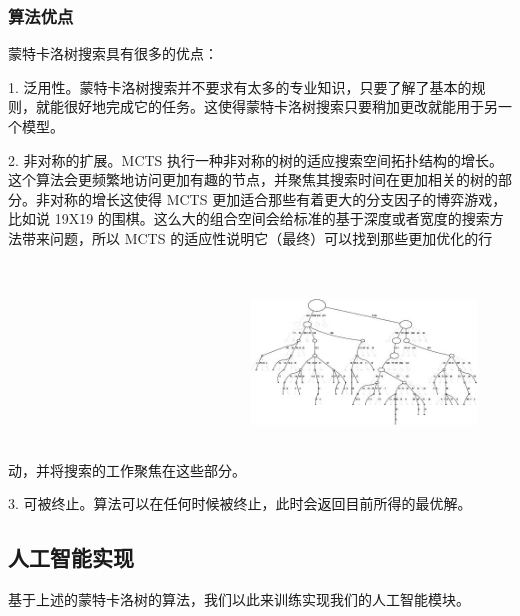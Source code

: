 \documentclass[a4paper]{article}
\begin{document}
\begin{multicols}{2}
\subsubsection{算法优点}
蒙特卡洛树搜索具有很多的优点\cite{k4}：\par
1.	泛用性。蒙特卡洛树搜索并不要求有太多的专业知识，只要了解了基本的规则，就能很好地完成它的任务。这使得蒙特卡洛树搜索只要稍加更改就能用于另一个模型。\par
2.	非对称的扩展。\cite{k5}MCTS 执行一种非对称的树的适应搜索空间拓扑结构的增长。这个算法会更频繁地访问更加有趣的节点，并聚焦其搜索时间在更加相关的树的部分。非对称的增长这使得 MCTS 更加适合那些有着更大的分支因子的博弈游戏，比如说 19X19 的围棋。这么大的组合空间会给标准的基于深度或者宽度的搜索方法带来问题，所以 MCTS 的适应性说明它（最终）可以找到那些更加优化的行动，并将搜索的工作聚焦在这些部分。
\includegraphics[width=6cm,height=6cm]{k4.jpg}
\par
3.	可被终止。算法可以在任何时候被终止，此时会返回目前所得的最优解。\cite{k6}\par
\subsection{人工智能实现}
基于上述的蒙特卡洛树的算法，我们以此来训练实现我们的人工智能模块。

\end{multicols}
\end{document}
